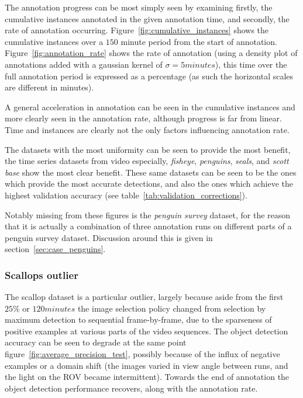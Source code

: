 The annotation progress can be most simply seen by examining firstly, the cumulative instances annotated in the given annotation time, and secondly, the rate of annotation occurring. Figure~\ref{fig:cumulative_instances} shows the cumulative instances over a $150$ minute period from the start of annotation. Figure~\ref{fig:annotation_rate} shows the rate of annotation (using a density plot of annotations added with a gaussian kernel of $\sigma = 5 minutes$), this time over the full annotation period is expressed as a percentage (as such the horizontal scales are different in minutes).

A general acceleration in annotation can be seen in the  cumulative instances and more clearly seen in the annotation rate, although progress is far from linear. Time and instances are clearly not the only factors influencing annotation rate. 

The datasets with the most uniformity can be seen to provide the most benefit, the time series datasets from video especially, \emph{fisheye}, \emph{penguins}, \emph{seals}, and \emph{scott base} show the most clear benefit. These same datasets can be seen to be the ones which provide the most accurate detections, and also the ones which achieve the highest validation accuracy (see table~\ref{tab:validation_corrections}).

Notably missing from these figures is the \emph{penguin survey} dataset, for the reason that it is actually a combination of three annotation runs on different parts of a penguin survey dataset. Discussion around this is given in section~\ref{sec:case_penguins}.


\subsubsection{Scallops outlier}
\label{sec:scallop_outlier}

The scallop dataset is a particular outlier, largely because aside from the first $25\%$ or $120 minutes$ the image selection policy changed from selection by maximum detection to sequential frame-by-frame, due to the sparseness of positive examples at various parts of the video sequences. The object detection accuracy can be seen to degrade at the same point figure~\ref{fig:average_precision_test}, possibly because of the influx of negative examples or a domain shift (the images varied in view angle between runs, and the light on the \gls{ROV} became intermittent). Towards the end of annotation the object detection performance recovers, along with the annotation rate. 



